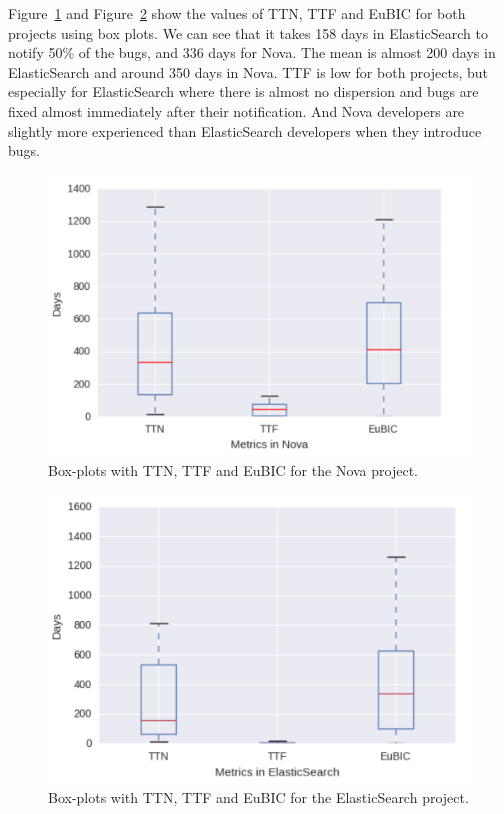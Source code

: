 \documentclass[10pt, conference]{IEEEtran}
\begin{document}
Figure~\ref{fig:meansOfNova} and Figure~\ref{fig:meansOfES} show the values of TTN, TTF and EuBIC for both projects using box plots. We can see that it takes 158 days in ElasticSearch to notify 50\% of the bugs, and 336 days for Nova. The mean is almost 200 days in ElasticSearch and around 350 days in Nova. TTF is low for both projects, but especially for ElasticSearch where there is almost no dispersion and bugs are fixed almost immediately after their notification. And Nova developers are slightly more experienced than ElasticSearch developers when they introduce bugs.

\begin{figure}[ht]
\centering
\includegraphics[width=\columnwidth]{boxplotNova.png}
\caption{Box-plots with TTN, TTF and EuBIC for the Nova project.}
\label{fig:meansOfNova}       %
\end{figure}

\begin{figure}[ht]
\centering
\includegraphics[width=\columnwidth]{boxplotES.png}
\caption{Box-plots with TTN, TTF and EuBIC for the ElasticSearch project.}
\label{fig:meansOfES}       %
\end{figure}
\end{document}
